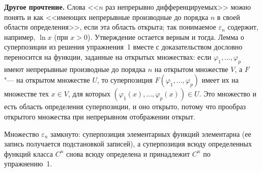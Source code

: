\begin{solution}[3 (\S\,5)]
\textbf{Другое прочтение.} Слова <<$n$ раз непрерывно дифференцируемых>>
можно понять и как <<имеющих непрерывные производные до порядка $n$ в своей
области определения>>, если эта область открыта; так понимаемое
$\varepsilon_n$ содержит, например, $\ln x$ (при $x>0$). Утверждение остается
верным и тогда. Лемма о суперпозиции из решения упражнения~1 вместе
с доказательством дословно переносится на функции, заданные на открытых
множествах: если $\varphi_1,\dots,\varphi_p$ имеют непрерывные производные до
порядка $n$ на открытом множестве $V$, а $F$ "--- на открытом множестве $U$,
то суперпозиция $F(\varphi_1,\dots,\varphi_p)$ имеет их на множестве тех
$x\in V$, для которых $(\varphi_1(x),\dots,\varphi_p(x))\in U$. Это множество
и есть область определения суперпозиции, и оно открыто, потому что прообраз
открытого множества при непрерывном отображении открыт.

\answer Множество $\varepsilon_n$ замкнуто: суперпозиция элементарных
функций элементарна (ее запись получается подстановкой записей), а
суперпозиция всюду определенных функций класса $C^n$ снова всюду определена
и принадлежит $C^n$ по упражнению~1.
\end{solution}

